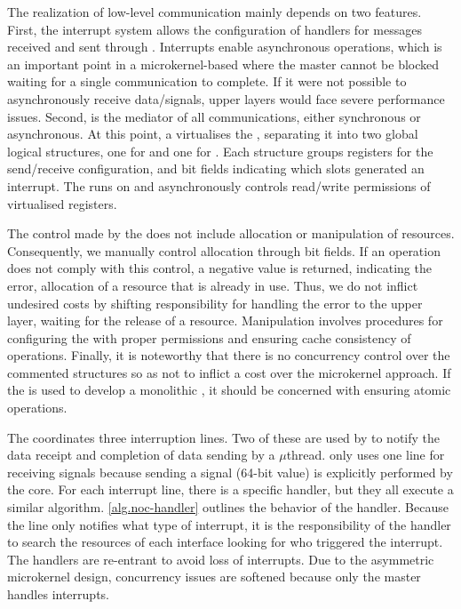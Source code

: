			The realization of low-level communication mainly depends on two \mppa features.
			First, the interrupt system allows the configuration of handlers for messages
			received and sent through \noc. Interrupts enable asynchronous operations,
			which is an important point in a microkernel-based \os where the
			master cannot be blocked waiting for a single communication to complete.
			If it were not possible to asynchronously receive
			data/signals, upper layers would face severe performance issues. Second,
			\dma is the mediator of all communications, either synchronous or asynchronous.
			At this point, a \hypervisor virtualises the \dma, separating it into two global
			logical structures, one for \cnoc and one for \dnoc. Each structure groups
			registers for the send/receive configuration, and bit fields indicating which
			slots generated an interrupt. The \hypervisor runs on \rms and asynchronously
			controls read/write permissions of virtualised registers.

			The control made by the \hypervisor does not include allocation or manipulation
			of resources. Consequently, we manually control allocation through bit fields.
			If an operation does not comply with this control, a negative value is returned,
			indicating the error, \eg allocation of a resource that is already in use.
			Thus, we do not inflict undesired costs by shifting responsibility for handling
			the error to the upper layer, \eg waiting for the release of a resource.
			Manipulation involves procedures for configuring the \dma with proper
			permissions and ensuring cache consistency of operations. Finally, it is
			noteworthy that there is no concurrency control over the commented
			structures so as not to inflict a cost over the microkernel approach.
			If the \nanvixhal is used to develop a monolithic \os, it should be
			concerned with ensuring atomic operations.

			The \dma coordinates three interruption lines. Two of these are used by
			\dnoc to notify the data receipt and completion of data sending by a
			$\mu$thread. \cnoc only uses one line for receiving signals because
			sending a signal (64-bit value) is explicitly performed by the core.
			For each interrupt line, there is a specific handler, but they all
			execute a similar algorithm. \autoref{alg.noc-handler} outlines
			the behavior of the \noc handler. Because the line only notifies what
			type of interrupt, it is the responsibility of the handler to search
			the resources of each interface looking for who triggered the interrupt.
			The handlers are re-entrant to avoid loss of interrupts. Due to the
			asymmetric microkernel design, concurrency issues are softened because only
			the master handles interrupts.

